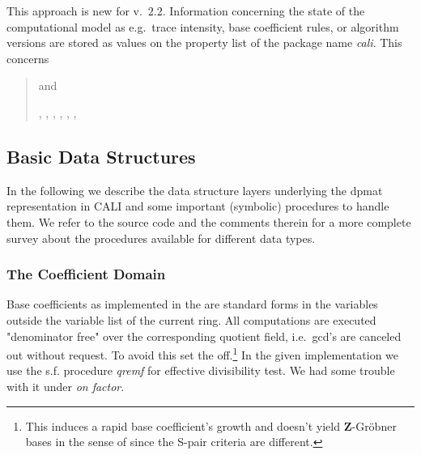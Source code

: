 
This approach is new for v.\ 2.2. Information concerning the state of
the computational model as e.g.\ trace intensity, base coefficient
rules, or algorithm versions are stored as values on the property list
of the package name \emph{cali}. This concerns
\begin{quote}
 and 










, , , ,
, ,  

\end{quote}


\subsection{Basic Data Structures}

In the following we describe the data structure layers underlying the 
dpmat representation in CALI and some important (symbolic) procedures
to handle them. We refer to the source code and the comments therein for
a more complete survey about the procedures available for different
data types.

\subsubsection{The Coefficient Domain}

Base coefficients as implemented in the  are standard
forms in the variables outside the variable list of the current
ring. All computations are executed "denominator free" over the
corresponding quotient field, i.e.\ gcd's are canceled out without 
request. To avoid this set the  off.\footnote{This
induces a rapid base coefficient's growth and doesn't yield \textbf{Z}-Gr\"obner 
bases in the sense of \cite{GTZ} since the S-pair criteria are
different.} In the given implementation we use the s.f. procedure {\em
qremf} for effective divisibility test. We had some trouble with it
under \emph{on factor}. 

